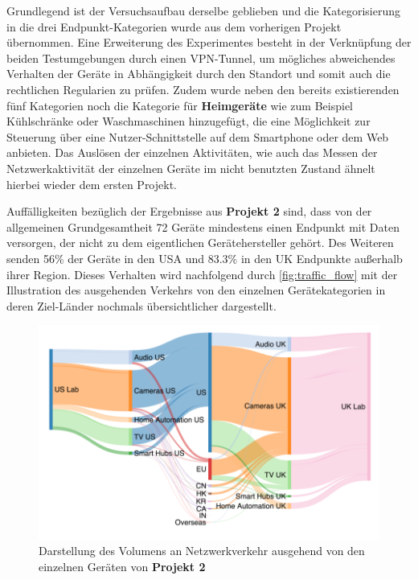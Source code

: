 \noindent Grundlegend ist der Versuchsaufbau derselbe geblieben und die Kategorisierung in die drei Endpunkt-Kategorien wurde aus dem vorherigen Projekt übernommen. Eine Erweiterung des Experimentes besteht in der Verknüpfung der beiden Testumgebungen durch einen VPN-Tunnel, um mögliches abweichendes Verhalten der Geräte in Abhängigkeit durch den Standort und somit auch die rechtlichen Regularien zu prüfen. Zudem wurde neben den bereits existierenden fünf Kategorien noch die Kategorie für \textbf{Heimgeräte} wie zum Beispiel Kühlschränke oder Waschmaschinen hinzugefügt, die eine Möglichkeit zur Steuerung über eine Nutzer-Schnittstelle auf dem Smartphone oder dem Web anbieten. Das Auslösen der einzelnen Aktivitäten, wie auch das Messen der Netzwerkaktivität der einzelnen Geräte im nicht benutzten Zustand ähnelt hierbei wieder dem ersten Projekt.

\noindent Auffälligkeiten bezüglich der Ergebnisse aus \textbf{Projekt 2} sind, dass von der allgemeinen Grundgesamtheit 72 Geräte mindestens einen Endpunkt mit Daten versorgen, der nicht zu dem eigentlichen Gerätehersteller gehört. Des Weiteren senden 56\% der Geräte in den USA und 83.3\% in den UK Endpunkte außerhalb ihrer Region. Dieses Verhalten wird nachfolgend durch \ref{fig:traffic_flow} mit der Illustration des ausgehenden Verkehrs von den einzelnen Gerätekategorien in deren Ziel-Länder nochmals übersichtlicher dargestellt.
\begin{figure}
    \centering
    \includegraphics[scale=0.3]{main/pictures/projekt_two/Traffic_Flow_Destinations}
    \caption{Darstellung des Volumens an Netzwerkverkehr ausgehend von den einzelnen Geräten von \textbf{Projekt 2} \cite{Ren2019}}
    \label{fig:taffic_flow}
\end{figure}

